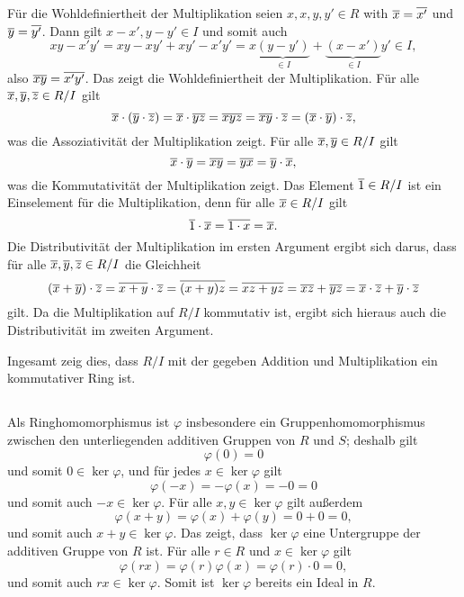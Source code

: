 Für die Wohldefiniertheit der Multiplikation seien $x, x, y, y' \in R$ with $\overline{x} = \overline{x'}$ und $\overline{y} = \overline{y'}$.
Dann gilt $x - x', y - y' \in I$ und somit auch
\[
      xy - x'y'
  =   xy - xy' + xy' - x'y'
  =   x \underbrace{(y-y')}_{\in I} + \underbrace{(x-x')}_{\in I} y'
  \in I,
\]
also $\overline{xy} = \overline{x'y'}$.
Das zeigt die Wohldefiniertheit der Multiplikation.
Für alle $\overline{x}, \overline{y}, \overline{z} \in R/I$ gilt
\[
    \overline{x} \cdot (\overline{y} \cdot \overline{z})
  = \overline{x} \cdot \overline{yz}
  = \overline{xyz}
  = \overline{xy} \cdot \overline{z}
  = (\overline{x} \cdot \overline{y}) \cdot \overline{z},
\]
was die Assoziativität der Multiplikation zeigt.
Für alle $\overline{x}, \overline{y} \in R/I$ gilt
\[
    \overline{x} \cdot \overline{y}
  = \overline{xy}
  = \overline{yx}
  = \overline{y} \cdot \overline{x},
\]
was die Kommutativität der Multiplikation zeigt.
Das Element $\overline{1} \in R/I$ ist ein Einselement für die Multiplikation, denn für alle $\overline{x} \in R/I$ gilt
\[
    \overline{1} \cdot \overline{x}
  = \overline{1 \cdot x}
  = \overline{x}.
\]
Die Distributivität der Multiplikation im ersten Argument ergibt sich darus, dass für alle $\overline{x}, \overline{y}, \overline{z} \in R/I$ die Gleichheit
\[
  (\overline{x} + \overline{y}) \cdot \overline{z}
  = \overline{x + y} \cdot \overline{z}
  = \overline{(x + y) z}
  = \overline{xz + yz}
  = \overline{xz} + \overline{yz}
  = \overline{x} \cdot \overline{z} + \overline{y} \cdot \overline{z}
\]
gilt.
Da die Multiplikation auf $R/I$ kommutativ ist, ergibt sich hieraus auch die Distributivität im zweiten Argument.

Ingesamt zeig dies, dass $R/I$ mit der gegeben Addition und Multiplikation ein kommutativer Ring ist.





\subsection{}

Als Ringhomomorphismus ist $\varphi$ insbesondere ein Gruppenhomomorphismus zwischen den unterliegenden additiven Gruppen von $R$ und $S$;
deshalb gilt
\[
  \varphi(0) = 0
\]
und somit $0 \in \ker \varphi$, und für jedes $x \in \ker \varphi$ gilt
\[
    \varphi(-x)
  = - \varphi(x)
  = - 0
  = 0
\]
und somit auch $-x \in \ker \varphi$.
Für alle $x, y \in \ker \varphi$ gilt außerdem
\[
    \varphi(x + y)
  = \varphi(x) + \varphi(y)
  = 0 + 0
  = 0,
\]
und somit auch $x + y \in \ker \varphi$.
Das zeigt, dass $\ker \varphi$ eine Untergruppe der additiven Gruppe von $R$ ist.
Für alle $r \in R$ und $x \in \ker \varphi$ gilt
\[
    \varphi(rx)
  = \varphi(r) \varphi(x)
  = \varphi(r) \cdot 0
  = 0,
\]
und somit auch $rx \in \ker \varphi$.
Somit ist $\ker \varphi$ bereits ein Ideal in $R$.





